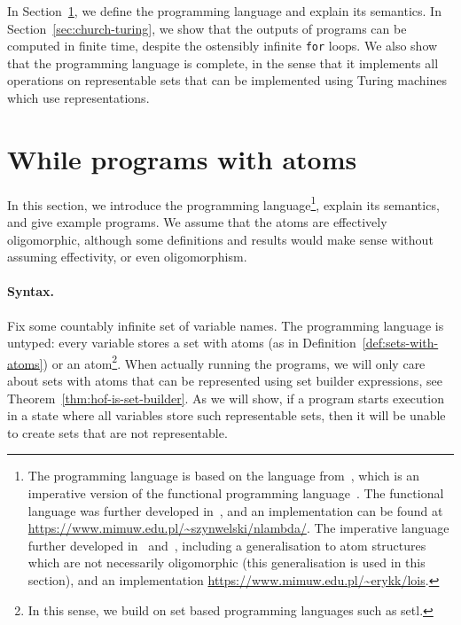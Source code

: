 In Section~\ref{sec:definition-of-while-programs}, we define the programming language and explain its semantics. In Section~\ref{sec:church-turing}, we show that the outputs of programs can be computed in finite time, despite the ostensibly infinite {\tt for} loops. 
We also show that the programming language is complete, in the sense that it implements all operations on representable sets that can be implemented using Turing machines which use representations.

 





\section{While programs with atoms}
\label{sec:definition-of-while-programs}





In this section, we introduce the programming language\footnote{The programming language  is based on the language from~\cite{DBLP:conf/fsttcs/BojanczykT12}, which is an imperative version of the functional programming language~\cite{DBLP:conf/popl/BojanczykBKL12}. The functional language was further developed in~\cite{DBLP:conf/popl/MoermanS0KS17}, and an implementation can be found at \url{https://www.mimuw.edu.pl/~szynwelski/nlambda/}. The imperative language further developed in~\cite{DBLP:conf/cade/KopczynskiT16} and~\cite{DBLP:conf/popl/KopczynskiT17}, including a generalisation to atom structures which are not necessarily oligomorphic (this generalisation is used in this section), and an implementation \url{https://www.mimuw.edu.pl/~erykk/lois}. }, explain its semantics,  and give example programs. We assume that the atoms are effectively oligomorphic, although some definitions and results would make sense without assuming effectivity, or even oligomorphism.






\paragraph*{Syntax.}   Fix some  countably infinite set of variable names.  The programming language is untyped:  every variable   stores a  set with atoms (as in Definition~\ref{def:sets-with-atoms}) or an atom\footnote{In this sense, we build on set based programming languages such as {\sc setl}.}. When actually running the programs, we will only care about sets with atoms that can be represented using set builder expressions, see Theorem~\ref{thm:hof-is-set-builder}. As we will show, if  a program starts execution in a state where all  variables store such representable sets, then it  will be unable to create sets that are not representable. 

